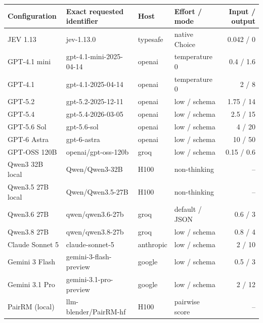 \begin{tabular}{@{}llllr@{}}
\toprule
Configuration & Exact requested identifier & Host & Effort / mode & Input / output \\
\midrule
JEV 1.13 & jev-1.13.0 & typesafe & native Choice & 0.042 / 0 \\
GPT-4.1 mini & gpt-4.1-mini-2025-04-14 & openai & temperature 0 & 0.4 / 1.6 \\
GPT-4.1 & gpt-4.1-2025-04-14 & openai & temperature 0 & 2 / 8 \\
GPT-5.2 & gpt-5.2-2025-12-11 & openai & low / schema & 1.75 / 14 \\
GPT-5.4 & gpt-5.4-2026-03-05 & openai & low / schema & 2.5 / 15 \\
GPT-5.6 Sol & gpt-5.6-sol & openai & low / schema & 4 / 20 \\
GPT-6 Astra & gpt-6-astra & openai & low / schema & 10 / 50 \\
GPT-OSS 120B & openai/gpt-oss-120b & groq & low / schema & 0.15 / 0.6 \\
Qwen3 32B local & Qwen/Qwen3-32B & H100 & non-thinking & -- \\
Qwen3.5 27B local & Qwen/Qwen3.5-27B & H100 & non-thinking & -- \\
Qwen3.6 27B & qwen/qwen3.6-27b & groq & default / JSON & 0.6 / 3 \\
Qwen3.8 27B & qwen/qwen3.8-27b & groq & low / schema & 0.8 / 4 \\
Claude Sonnet 5 & claude-sonnet-5 & anthropic & low / schema & 2 / 10 \\
Gemini 3 Flash & gemini-3-flash-preview & google & low / schema & 0.5 / 3 \\
Gemini 3.1 Pro & gemini-3.1-pro-preview & google & low / schema & 2 / 12 \\
PairRM (local) & llm-blender/PairRM-hf & H100 & pairwise score & -- \\
\bottomrule
\end{tabular}
